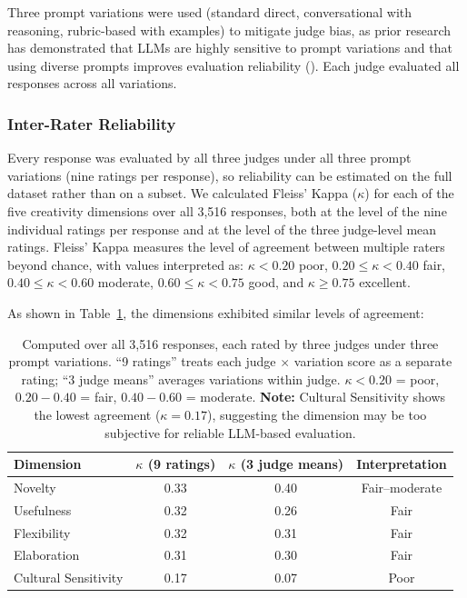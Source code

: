 \documentclass{article}
\begin{document}
Three prompt variations were used (standard direct, conversational with reasoning, rubric-based with examples) to mitigate judge bias, as prior research has demonstrated that LLMs are highly sensitive to prompt variations and that using diverse prompts improves evaluation reliability (\cite{rem_hida_f636adf1, hui_wei_3d8324a2}). Each judge evaluated all responses across all variations.

\subsubsection{Inter-Rater Reliability}

Every response was evaluated by all three judges under all three prompt variations (nine ratings per response), so reliability can be estimated on the full dataset rather than on a subset. We calculated Fleiss' Kappa (\(\kappa\)) for each of the five creativity dimensions over all 3,516 responses, both at the level of the nine individual ratings per response and at the level of the three judge-level mean ratings. Fleiss' Kappa measures the level of agreement between multiple raters beyond chance, with values interpreted as: \(\kappa < 0.20\) poor, \(0.20 \leq \kappa < 0.40\) fair, \(0.40 \leq \kappa < 0.60\) moderate, \(0.60 \leq \kappa < 0.75\) good, and \(\kappa \geq 0.75\) excellent.

As shown in Table~\ref{tab:inter_rater}, the dimensions exhibited similar levels of agreement:

\begin{table}[H]
\centering
\caption{Inter-Rater Reliability (Fleiss' Kappa) by Dimension}
\label{tab:inter_rater}
\begin{tabular}{lccc}
\toprule
\textbf{Dimension} & \(\kappa\) (9 ratings) & \(\kappa\) (3 judge means) & \textbf{Interpretation} \\
\midrule
Novelty & 0.33 & 0.40 & Fair--moderate \\
Usefulness & 0.32 & 0.26 & Fair \\
Flexibility & 0.32 & 0.31 & Fair \\
Elaboration & 0.31 & 0.30 & Fair \\
Cultural Sensitivity & 0.17 & 0.07 & Poor \\
\bottomrule
\end{tabular}
\caption*{\footnotesize Computed over all 3,516 responses, each rated by three judges under three prompt variations. ``9 ratings'' treats each judge $\times$ variation score as a separate rating; ``3 judge means'' averages variations within judge. \(\kappa < 0.20\) = poor, \(0.20-0.40\) = fair, \(0.40-0.60\) = moderate. \textbf{Note:} Cultural Sensitivity shows the lowest agreement (\(\kappa = 0.17\)), suggesting the dimension may be too subjective for reliable LLM-based evaluation.}
\end{table}
\end{document}
